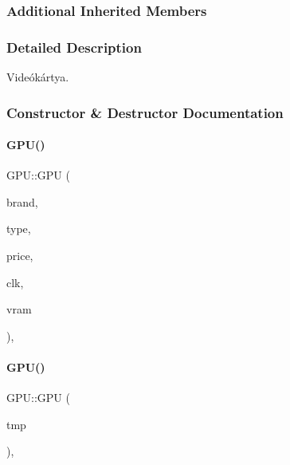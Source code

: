 \subsubsection*{Additional Inherited Members}


\subsubsection{Detailed Description}
Videókártya. 

\subsubsection{Constructor \& Destructor Documentation}
\mbox{\label{class_g_p_u_a358f512b1583399e68f76248bb305e61}} 
\paragraph{\texorpdfstring{GPU()}{GPU()}\hspace{0.1cm}{\footnotesize\ttfamily [1/2]}}
{\footnotesize\ttfamily G\+P\+U\+::\+G\+PU (\begin{DoxyParamCaption}\item[{\mbox{\hyperlink{class_string}{String}}}]{brand,  }\item[{\mbox{\hyperlink{class_string}{String}}}]{type,  }\item[{int}]{price,  }\item[{int}]{clk,  }\item[{int}]{vram }\end{DoxyParamCaption})\hspace{0.3cm}{\ttfamily [inline]}, {\ttfamily [explicit]}}

\mbox{\label{class_g_p_u_a9b1632e965c26051ae583c9b5e1c2e3c}} 
\paragraph{\texorpdfstring{GPU()}{GPU()}\hspace{0.1cm}{\footnotesize\ttfamily [2/2]}}
{\footnotesize\ttfamily G\+P\+U\+::\+G\+PU (\begin{DoxyParamCaption}\item[{\mbox{\hyperlink{struct_temp_input}{Temp\+Input}} \&}]{tmp }\end{DoxyParamCaption})\hspace{0.3cm}{\ttfamily [inline]}, {\ttfamily [explicit]}}



